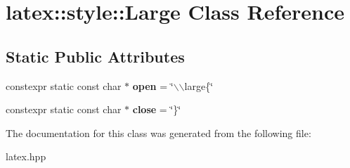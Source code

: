 \hypertarget{classlatex_1_1style_1_1Large}{\section{latex\-:\-:style\-:\-:\-Large \-Class \-Reference}
\label{classlatex_1_1style_1_1Large}
}
\subsection*{\-Static \-Public \-Attributes}
\begin{DoxyCompactItemize}
\item 
\hypertarget{classlatex_1_1style_1_1Large_aeda83a01ded8b49a2952336684c01ce8}{constexpr static const char $\ast$ {\bfseries open} = \char`\"{}$\backslash$$\backslash$large\{\char`\"{}}\label{classlatex_1_1style_1_1Large_aeda83a01ded8b49a2952336684c01ce8}

\item 
\hypertarget{classlatex_1_1style_1_1Large_a7920d55c91d0975f916bb07d49e3d8e8}{constexpr static const char $\ast$ {\bfseries close} = \char`\"{}\}\char`\"{}}\label{classlatex_1_1style_1_1Large_a7920d55c91d0975f916bb07d49e3d8e8}

\end{DoxyCompactItemize}


\-The documentation for this class was generated from the following file\-:\begin{DoxyCompactItemize}
\item 
latex.\-hpp\end{DoxyCompactItemize}
